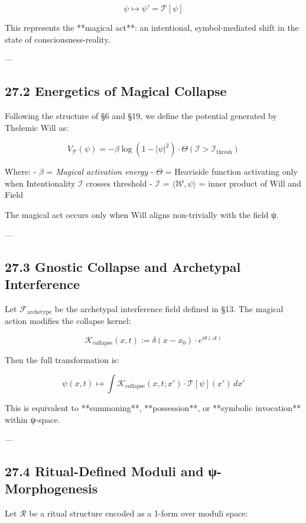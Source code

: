 \documentclass[12pt]{article}
\begin{document}
\begin{enumerate}
\[
\psi \mapsto \psi' = \mathcal{T}[\psi]
\]

This represents the **magical act**: an intentional, symbol-mediated shift in the state of consciousness-reality.

---

\subsection*{27.2 Energetics of Magical Collapse}

Following the structure of §6 and §19, we define the potential generated by Thelemic Will as:

\[
V_{\mathcal{T}}(\psi) = -\beta \log(1 - |\psi|^2) \cdot \Theta(\mathcal{I} > \mathcal{I}_{\text{thresh}})
\]

Where:
- $\beta$ = \textit{Magical activation energy}
- $\Theta$ = Heaviside function activating only when Intentionality $\mathcal{I}$ crosses threshold
- $\mathcal{I}$ = $\langle \mathcal{W}, \psi \rangle$ = inner product of Will and Field

The magical act occurs only when Will aligns non-trivially with the field ψ.

---

\subsection*{27.3 Gnostic Collapse and Archetypal Interference}

Let $\mathcal{F}_{\text{archetype}}$ be the archetypal interference field defined in §13.  
The magical action modifies the collapse kernel:

\[
\mathcal{K}_{\text{collapse}}(x, t) := \delta(x - x_0) \cdot e^{i \theta(\mathcal{A})}
\]

Then the full transformation is:

\[
\psi(x, t) \mapsto \int \mathcal{K}_{\text{collapse}}(x, t; x') \cdot \mathcal{T}[\psi](x') \, dx'
\]

This is equivalent to **summoning**, **possession**, or **symbolic invocation** within ψ-space.

---

\subsection*{27.4 Ritual-Defined Moduli and ψ-Morphogenesis}

Let $\mathcal{R}$ be a ritual structure encoded as a 1-form over moduli space:


\end{enumerate}
\end{document}
